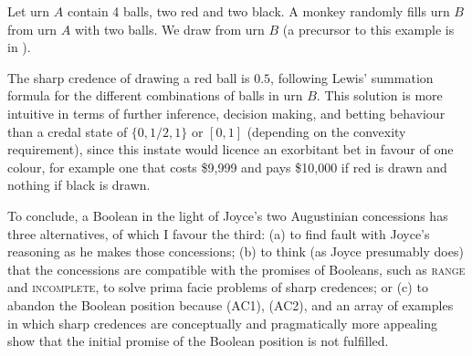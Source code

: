 \documentclass[11pt]{article}
\begin{document}
\begin{quotex}
  \label{ex:monkey} Let urn $A$ contain 4
  balls, two red and two black. A monkey randomly fills urn $B$ from
  urn $A$ with two balls. We draw from urn $B$ (a precursor to this
  example is in ).
\end{quotex}

The sharp credence of drawing a red ball is $0.5$, following Lewis'
summation formula for the different combinations of balls in urn $B$.
This solution is more intuitive in terms of further inference,
decision making, and betting behaviour than a credal state of
$\{0,1/2,1\}$ or $[0,1]$ (depending on the convexity requirement),
since this instate would licence an exorbitant bet in favour of one
colour, for example one that costs \$9,999 and pays \$10,000 if red is
drawn and nothing if black is drawn.

To conclude, a Boolean in the light of Joyce's two Augustinian
concessions has three alternatives, of which I favour the third: (a)
to find fault with Joyce's reasoning as he makes those concessions;
(b) to think (as Joyce presumably does) that the concessions are
compatible with the promises of Booleans, such as \textsc{range} and
\textsc{incomplete}, to solve prima facie problems of sharp credences;
or (c) to abandon the Boolean position because (AC1), (AC2), and an
array of examples in which sharp credences are conceptually and
pragmatically more appealing show that the initial promise of the
Boolean position is not fulfilled.

 

\end{document}
